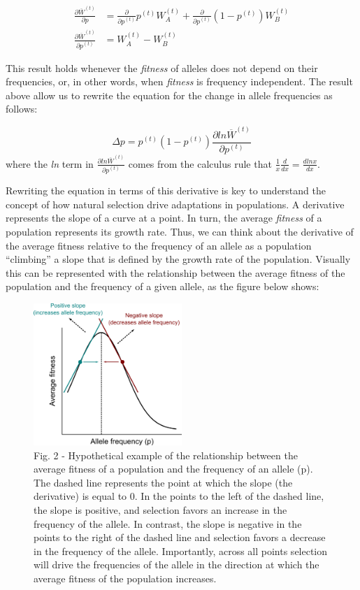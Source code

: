 \documentclass[
]{book}
\begin{document}
\[\begin{aligned}
\frac{\partial \overline{W}^{(t)}}{\partial p} &= \frac{\partial}{\partial p^{(t)}}p^{(t)}W_{A}^{(t)} + \frac{\partial}{\partial p^{(t)}}(1-p^{(t)})W_{B}^{(t)} \\
\frac{\partial \overline{W}^{(t)}}{\partial p^{(t)}} &=  W_{A}^{(t)} - W_{B}^{(t)}
\end{aligned}\]

This result holds whenever the \emph{fitness} of alleles does not depend on their frequencies, or, in other words, when \emph{fitness} is frequency independent. The result above allow us to rewrite the equation for the change in allele frequencies as follows:

\[
\Delta p=p^{(t)}(1-p^{(t)})\frac{\partial ln\overline{W}^{(t)}}{\partial p^{(t)}}
\] where the \emph{ln} term in \(\frac{\partial ln\overline{W}^{(t)}}{\partial p^{(t)}}\) comes from the calculus rule that \(\frac{1}{x}\frac{d}{dx} = \frac{dlnx}{dx}\).

Rewriting the equation in terms of this derivative is key to understand the concept of how natural selection drive adaptations in populations. A derivative represents the slope of a curve at a point. In turn, the average \emph{fitness} of a population represents its growth rate. Thus, we can think about the derivative of the average fitness relative to the frequency of an allele as a population ``climbing'' a slope that is defined by the growth rate of the population. Visually this can be represented with the relationship between the average fitness of the population and the frequency of a given allele, as the figure below shows:

\begin{figure}
\centering
\includegraphics[width=0.5\textwidth,height=\textheight]{figs/fig2.png}
\caption{Fig. 2 - Hypothetical example of the relationship between the average fitness of a population and the frequency of an allele (p). The dashed line represents the point at which the slope (the derivative) is equal to 0. In the points to the left of the dashed line, the slope is positive, and selection favors an increase in the frequency of the allele. In contrast, the slope is negative in the points to the right of the dashed line and selection favors a decrease in the frequency of the allele. Importantly, across all points selection will drive the frequencies of the allele in the direction at which the average fitness of the population increases.}
\end{figure}
\end{document}
